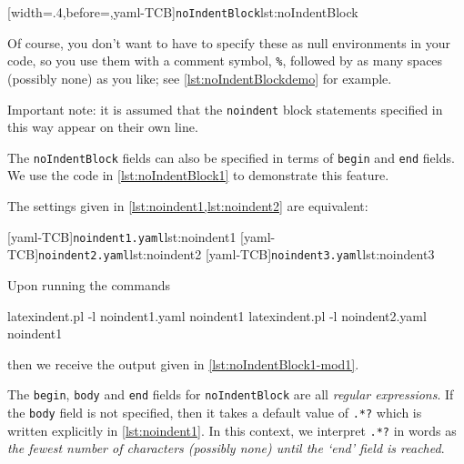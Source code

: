 	[width=.4\linewidth,before=\centering,yaml-TCB]{\texttt{noIndentBlock}}{lst:noIndentBlock}

	Of course, you don't want to have to specify these as null environments in your code, so
	you use them with a comment symbol, \lstinline!%!, followed by as many spaces (possibly
	none) as you like; see \cref{lst:noIndentBlockdemo} for example.


	Important note: it is assumed that the \texttt{noindent} block statements specified in
	this way appear on their own line.

	The%
	 \texttt{noIndentBlock} fields can also be specified in terms of \texttt{begin} and
	\texttt{end} fields. We use the code in \cref{lst:noIndentBlock1} to demonstrate this
	feature.


	The settings given in \cref{lst:noindent1,lst:noindent2} are equivalent:

	\begin{cmhtcbraster}[raster columns=3,
			raster left skip=-3.5cm,
			raster right skip=-2cm,
			raster column skip=.03\linewidth]
		[yaml-TCB]{\texttt{noindent1.yaml}}{lst:noindent1}
		[yaml-TCB]{\texttt{noindent2.yaml}}{lst:noindent2}
		[yaml-TCB]{\texttt{noindent3.yaml}}{lst:noindent3}
	\end{cmhtcbraster}

	Upon running the commands
	\begin{commandshell}
latexindent.pl -l noindent1.yaml noindent1
latexindent.pl -l noindent2.yaml noindent1
\end{commandshell}
	then we receive the output given in \cref{lst:noIndentBlock1-mod1}.


	The \texttt{begin}, \texttt{body} and \texttt{end} fields for \texttt{noIndentBlock} are
	all \emph{regular expressions}. If the \texttt{body} field is not specified, then it
	takes a default value of
	\lstinline!.*?! which is written explicitly in \cref{lst:noindent1}. In this
	context, we interpret \lstinline!.*?! in words as \emph{the fewest number of characters
		(possibly none) until the `end' field is reached}.

